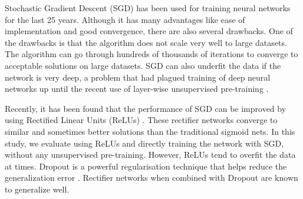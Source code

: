 \documentclass{article}
\begin{document}
Stochastic Gradient Descent (SGD) has been used for training neural networks for the last 25 years. Although it has many advantages like ease of implementation and good convergence, there are also several drawbacks. One of the drawbacks is that the algorithm does not scale very well to large datasets. The algorithm can go through hundreds of thousands of iterations to converge to acceptable solutions on large datasets. SGD can also underfit the data if the network is very deep, a problem that had plagued training of deep neural networks up until the recent use of layer-wise unsupervised pre-training \cite{hinton2006fast}. 

Recently, it has been found that the performance of SGD can be improved by using Rectified Linear Units (ReLUs) \cite{nair2010rectified,glorot2011deep}. These rectifier networks converge to similar and sometimes better solutions than the traditional sigmoid nets. In this study, we evaluate using ReLUs and directly training the network with SGD, without any unsupervised pre-training. However, ReLUs tend to overfit the data at times. Dropout is a powerful regularisation technique that helps reduce the generalization error \cite{hinton2012improving}. Rectifier networks when combined with Dropout are known to generalize well. 


\end{document}
